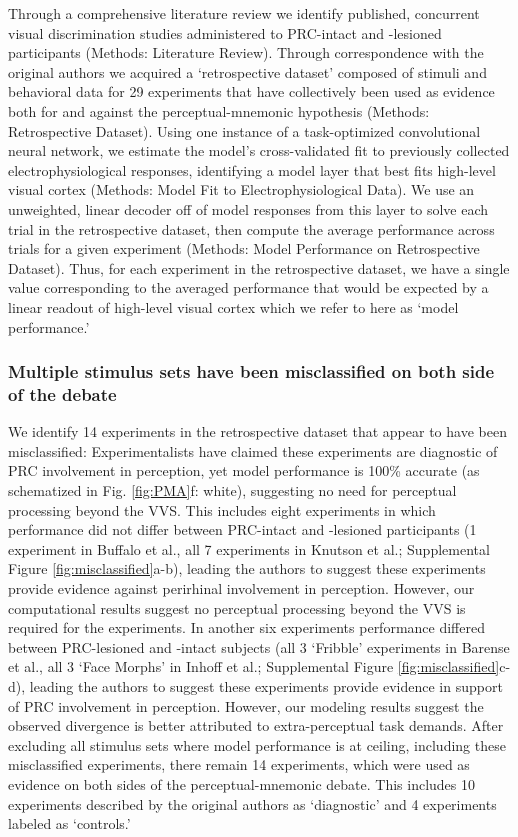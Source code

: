 \documentclass[11pt]{article}
\begin{document}
Through a comprehensive literature review we identify published, concurrent visual discrimination studies administered to PRC-intact and -lesioned participants (Methods: Literature Review). Through correspondence with the original authors we acquired a `retrospective dataset' composed of stimuli and behavioral data for 29 experiments that have collectively been used as evidence both for and against the perceptual-mnemonic hypothesis (Methods: Retrospective Dataset). Using one instance of a task-optimized convolutional neural network, we estimate the model's cross-validated fit to previously collected electrophysiological responses\cite{majaj2015simple}, identifying a model layer that best fits high-level visual cortex (Methods: Model Fit to Electrophysiological Data). We use an unweighted, linear decoder off of model responses from this layer to solve each trial in the retrospective dataset, then compute the average performance across trials for a given experiment (Methods: Model Performance on Retrospective Dataset). Thus, for each experiment in the retrospective dataset, we have a single value corresponding to the averaged performance that would be expected by a linear readout of high-level visual cortex which we refer to here as `model performance.' 

\subsubsection{Multiple stimulus sets have been misclassified on both side of the debate}

We identify 14 experiments in the retrospective dataset that appear to have been misclassified: Experimentalists have claimed these experiments are diagnostic of PRC involvement in perception, yet model performance is 100\% accurate (as schematized in Fig. \ref{fig:PMA}f: white), suggesting no need for perceptual processing beyond the VVS. This includes eight experiments in which performance did not differ between PRC-intact and -lesioned participants (1 experiment in Buffalo et al., all 7 experiments in Knutson et al.; Supplemental Figure \ref{fig:misclassified}a-b), leading the authors to suggest these experiments provide evidence against perirhinal involvement in perception\cite{buffalo1998human, knutson2012visual}. However, our computational results suggest no perceptual processing beyond the VVS is required for the experiments. In another six experiments performance differed between PRC-lesioned and -intact subjects (all 3 `Fribble' experiments in Barense et al., all 3 `Face Morphs' in Inhoff et al.; Supplemental Figure \ref{fig:misclassified}c-d), leading the authors to suggest these experiments provide evidence in support of PRC involvement in perception\cite{barense2007human, inhoff2019understanding}. However, our modeling results suggest the observed divergence is better attributed to extra-perceptual task demands. After excluding all stimulus sets where model performance is at ceiling, including these misclassified experiments, there remain 14 experiments, which were used as evidence on both sides of the perceptual-mnemonic debate. This includes 10 experiments described by the original authors as `diagnostic' and 4 experiments labeled as ‘controls.'
\end{document}

